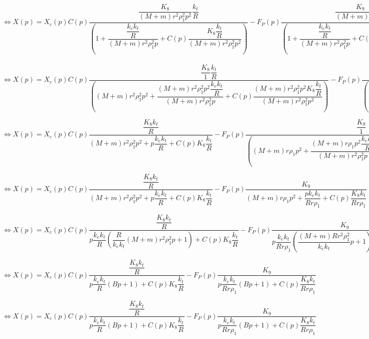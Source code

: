 $\Leftrightarrow X(p)
=
X_c(p) C(p)\dfrac{\dfrac{K_8}{\left(M+m\right)r^2\rho_1^2 p^2}  \dfrac{k_t}{R}}{\left( 1+ \dfrac{ \dfrac{k_ek_t}{R}}{\left(M+m\right)r^2\rho_1^2 p} + C(p)\dfrac{K_8 \dfrac{k_t}{R}}{\left(M+m\right)r^2\rho_1^2 p^2} \right)}
- F_P(p)\dfrac{\dfrac{K_9}{\left(M+m\right)r\rho_1 p^2}}{\left( 1+ \dfrac{ \dfrac{k_ek_t}{R}}{\left(M+m\right)r^2\rho_1^2 p} + C(p)\dfrac{K_8 \dfrac{k_t}{R}}{\left(M+m\right)r^2\rho_1^2 p^2} \right)}
$


$\Leftrightarrow X(p)
=
X_c(p) C(p)\dfrac{\dfrac{K_8}{1}  \dfrac{k_t}{R}}{\left( \left(M+m\right)r^2\rho_1^2 p^2+ \dfrac{\left(M+m\right)r^2\rho_1^2 p^2 \dfrac{k_ek_t}{R}}{\left(M+m\right)r^2\rho_1^2 p} + C(p)\dfrac{ \left(M+m\right)r^2\rho_1^2 p^2K_8 \dfrac{k_t}{R}}{\left(M+m\right)r^2\rho_1^2 p^2} \right)}
- F_P(p)\dfrac{\dfrac{K_9}{\left(M+m\right)r\rho_1 p^2}}{\left( 1+ \dfrac{ \dfrac{k_ek_t}{R}}{\left(M+m\right)r^2\rho_1^2 p} + C(p)\dfrac{K_8 \dfrac{k_t}{R}}{\left(M+m\right)r^2\rho_1^2 p^2} \right)}
$


$\Leftrightarrow X(p)
=
X_c(p) C(p)\dfrac{  \dfrac{K_8k_t}{R}}{
 \left(M+m\right)r^2\rho_1^2 p^2
 + p \dfrac{k_ek_t}{R} 
 + C(p)K_8 \dfrac{k_t}{R}
 }
- F_P(p)\dfrac{\dfrac{K_9}{1}}{\left( \left(M+m\right)r\rho_1 p^2+ \dfrac{ \left(M+m\right)r\rho_1 p^2\dfrac{k_ek_t}{R}}{\left(M+m\right)r^2\rho_1^2 p} + C(p)\dfrac{ \left(M+m\right)r\rho_1 p^2K_8 \dfrac{k_t}{R}}{\left(M+m\right)r^2\rho_1^2 p^2} \right)}
$


$\Leftrightarrow X(p)
=
X_c(p) C(p)\dfrac{  \dfrac{K_8k_t}{R}}{
 \left(M+m\right)r^2\rho_1^2 p^2
 + p \dfrac{k_ek_t}{R} 
 + C(p)K_8 \dfrac{k_t}{R}
 }
- F_P(p)\dfrac{K_9}{
 \left(M+m\right)r\rho_1 p^2
 + \dfrac{  pk_ek_t}{Rr\rho_1} 
 + C(p)\dfrac{ K_8 k_t}{Rr\rho_1 } }
$


$\Leftrightarrow X(p)
=
X_c(p) C(p)\dfrac{
\dfrac{K_8k_t}{R}}{
p\dfrac{k_ek_t}{R}\left(\dfrac{R}{k_ek_t}
 \left(M+m\right)r^2\rho_1^2 p
 +  1\right) 
 + C(p)K_8 \dfrac{k_t}{R}
 }
- F_P(p)\dfrac{K_9}{
p\dfrac{  k_ek_t}{Rr\rho_1}\left(
\dfrac{\left(M+m\right) Rr^2\rho_1^2}{  k_ek_t}  p
 + 1\right)
 + C(p)\dfrac{ K_8 k_t}{Rr\rho_1 } }
$



$\Leftrightarrow X(p)
=
X_c(p) C(p)\dfrac{
\dfrac{K_8k_t}{R}}{
p\dfrac{k_ek_t}{R}\left(B p
 +  1\right) 
 + C(p)K_8 \dfrac{k_t}{R}
 }
- F_P(p)\dfrac{K_9}{
p\dfrac{  k_ek_t}{Rr\rho_1}\left(
B  p
 + 1\right)
 + C(p)\dfrac{ K_8 k_t}{Rr\rho_1 } }
$

$\Leftrightarrow X(p)
=
X_c(p) C(p)\dfrac{
\dfrac{K_8k_t}{R}}{
p\dfrac{k_ek_t}{R}\left(B p
 +  1\right) 
 + C(p)K_8 \dfrac{k_t}{R}
 }
- F_P(p)\dfrac{K_9}{
p\dfrac{  k_ek_t}{Rr\rho_1}\left(
B  p
 + 1\right)
 + C(p)\dfrac{ K_8 k_t}{Rr\rho_1 } }
$

